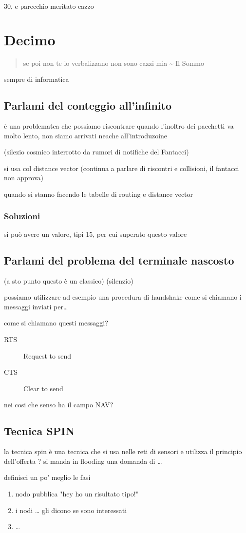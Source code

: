 \documentclass[11pt]{article}
\begin{document}
30, e parecchio meritato cazzo   

\section{Decimo}
\label{sec:orgd03e596}
\begin{quote}
se poi non te lo verbalizzano non sono cazzi mia
 \textasciitilde{} Il Sommo
\end{quote}
sempre di informatica
\subsection{Parlami del conteggio all'infinito}
\label{sec:org4c14fdf}
è una problematca che possiamo riscontrare quando l'inoltro dei pacchetti va molto lento,
non siamo arrivati neache all'introduzoine

(silezio cosmico interrotto da rumori di notifiche del Fantacci)

si usa col distance vector
(continua a parlare di riscontri e collisioni, il fantacci non approva)

quando si stanno facendo le tabelle di routing e distance vector
\subsubsection{Soluzioni}
\label{sec:org6a21539}
si può avere un valore, tipi 15, per cui superato questo valore

\subsection{Parlami del problema del terminale nascosto}
\label{sec:org612357f}
(a sto punto questo è un classico)
(silenzio)

possiamo utilizzare ad esempio una procedura di handshake
come si chiamano i messaggi inviati per\ldots{}

come si chiamano questi messaggi?
\begin{description}
\item[{RTS}] Request to send
\item[{CTS}] Clear to send
\end{description}

nei cosi che senso ha il campo NAV?

\subsection{Tecnica SPIN}
\label{sec:org9954322}
la tecnica spin è una tecnica che si usa nelle reti di sensori e utilizza il principio dell'offerta ?
si manda in flooding una domanda di \ldots{}

definisci un po' meglio le fasi
\begin{enumerate}
\item nodo pubblica "hey ho un risultato tipo!"
\item i nodi \ldots{} gli dicono se sono interessati
\item \ldots{}
\end{enumerate}
\end{document}
